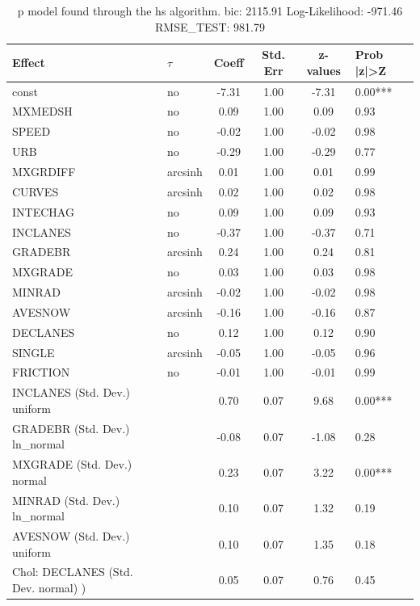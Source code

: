 \begin{table}
	\caption{p model found through the hs algorithm. bic: 2115.91 Log-Likelihood: -971.46 RMSE_TEST: 981.79}
	\begin{center}
		\begin{tabular}{|l|l|c|c|c|l|}
			\hline
			Effect & $\tau$ & Coeff & Std. Err & z-values & Prob |z|>Z \\
			\hline
			const & no & -7.31 & 1.00 & -7.31 & 0.00*** \\
			\hline
			MXMEDSH & no & 0.09 & 1.00 & 0.09 & 0.93 \\
			\hline
			SPEED & no & -0.02 & 1.00 & -0.02 & 0.98 \\
			\hline
			URB & no & -0.29 & 1.00 & -0.29 & 0.77 \\
			\hline
			MXGRDIFF & arcsinh & 0.01 & 1.00 & 0.01 & 0.99 \\
			\hline
			CURVES & arcsinh & 0.02 & 1.00 & 0.02 & 0.98 \\
			\hline
			INTECHAG & no & 0.09 & 1.00 & 0.09 & 0.93 \\
			\hline
			INCLANES & no & -0.37 & 1.00 & -0.37 & 0.71 \\
			\hline
			GRADEBR & arcsinh & 0.24 & 1.00 & 0.24 & 0.81 \\
			\hline
			MXGRADE & no & 0.03 & 1.00 & 0.03 & 0.98 \\
			\hline
			MINRAD & arcsinh & -0.02 & 1.00 & -0.02 & 0.98 \\
			\hline
			AVESNOW & arcsinh & -0.16 & 1.00 & -0.16 & 0.87 \\
			\hline
			DECLANES & no & 0.12 & 1.00 & 0.12 & 0.90 \\
			\hline
			SINGLE & arcsinh & -0.05 & 1.00 & -0.05 & 0.96 \\
			\hline
			FRICTION & no & -0.01 & 1.00 & -0.01 & 0.99 \\
			\hline
			INCLANES (Std. Dev.) uniform &  & 0.70 & 0.07 & 9.68 & 0.00*** \\
			\hline
			GRADEBR (Std. Dev.) ln_normal &  & -0.08 & 0.07 & -1.08 & 0.28 \\
			\hline
			MXGRADE (Std. Dev.) normal &  & 0.23 & 0.07 & 3.22 & 0.00*** \\
			\hline
			MINRAD (Std. Dev.) ln_normal &  & 0.10 & 0.07 & 1.32 & 0.19 \\
			\hline
			AVESNOW (Std. Dev.) uniform &  & 0.10 & 0.07 & 1.35 & 0.18 \\
			\hline
			 Chol: DECLANES (Std. Dev. normal) ) &  & 0.05 & 0.07 & 0.76 & 0.45 \\

\end{tabular}
\end{center}
\end{table}
